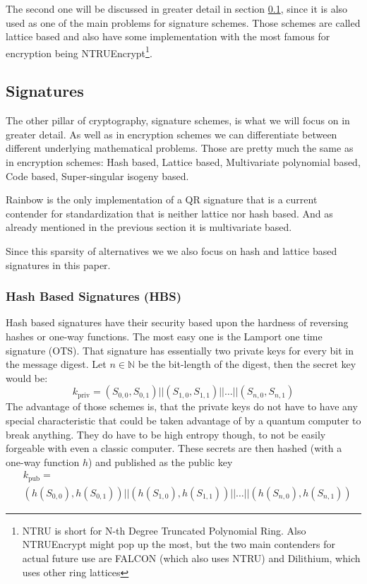 \documentclass[conference]{IEEEtran}
\newcommand{\comment}[1]{}
\begin{document}
The second one will be discussed in greater detail in section \ref{QR signatures}, since it is also used as one of the main problems for signature schemes.
Those schemes are called lattice based and also have some implementation with the most famous for encryption being NTRUEncrypt\footnote{NTRU is short for N-th Degree Truncated Polynomial Ring. Also NTRUEncrypt might pop up the most, but the two main contenders for actual future use are FALCON (which also uses NTRU) and Dilithium, which uses other ring lattices}.

\subsection{Signatures} \label{QR signatures}
\comment{ %
 code-based:   
- McEliece decrypt padded message digest - try thousands of paddings - signing takes 30secs, 4mb priv/pub KEY-size -not feasbale

} %
The other pillar of cryptography, signature schemes, is what we will focus on in greater detail.
As well as in encryption schemes we can differentiate between different underlying mathematical problems. Those are pretty much the same as in encryption schemes: 
Hash based,
Lattice based,
Multivariate polynomial based,
Code based,
Super-singular isogeny based.\cite{QR_sigs}

Rainbow is the only implementation of a QR signature that is a current contender for standardization that is neither lattice nor hash based.
And as already mentioned in the previous section it is multivariate based.

Since this sparsity of alternatives we we also focus on hash and lattice based signatures in this paper.

\subsubsection{Hash Based Signatures (HBS)}\label{HBS}
Hash based signatures have their security based upon the hardness of reversing hashes or one-way functions.
The most easy one is the Lamport one time signature (OTS).\cite{QR_algs} 
That signature has essentially two private keys for every bit in the message digest. 
Let $n \in \mathbb{N}$ be the bit-length of the digest, then the secret key would be: \[k_\text{priv}= (S_{0,0},S_{0,1}) || (S_{1,0},S_{1,1})|| \dots || (S_{n,0},S_{n,1})\]
The advantage of those schemes is, that the private keys do not have to have any special characteristic that could be taken advantage of by a quantum computer to break anything.
They do have to be high entropy though, to not be easily forgeable with even a classic computer. 
These secrets are then hashed (with a one-way function $h$) and published as the public key \begin{align*}
    &k_\text{pub}= \\ &(h(S_{0,0}),h(S_{0,1})) || (h(S_{1,0}),h(S_{1,1}))|| \dots || (h(S_{n,0}),h(S_{n,1}))
\end{align*}
\end{document}
